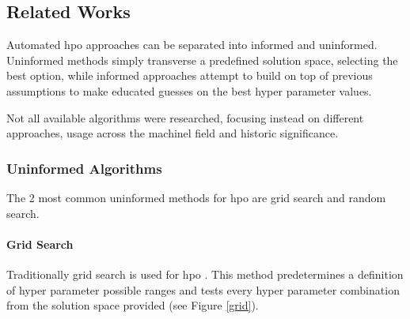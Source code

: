 
\subsection{Related Works}

Automated \acrshort{hpo} approaches can be separated into informed and uninformed. Uninformed methods simply transverse a predefined solution space, selecting the best option, while informed approaches attempt to build on top of previous assumptions to make educated guesses on the best hyper parameter values.

Not all available algorithms were researched, focusing instead on different approaches, usage across the \acrshort{machinel} field and historic significance.

\subsubsection{Uninformed Algorithms}

The 2 most common uninformed methods for \acrshort{hpo} are grid search and random search.

\paragraph{Grid Search}
Traditionally grid search is used for \acrshort{hpo} \parencite{liashchynskyi2019grid}. This method predetermines a definition of hyper parameter possible ranges and tests every hyper parameter combination from the solution space provided (see Figure \ref{grid}).

